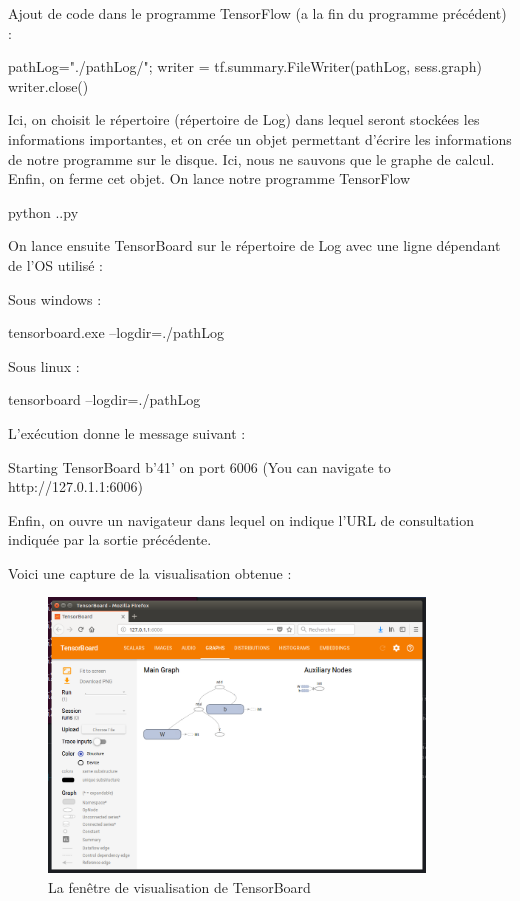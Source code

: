 \documentclass[a4paper,11pt]{book}
\theoremstyle{theo}
\begin{document}
Ajout de code dans le programme TensorFlow (a la fin du programme précédent) :
\begin{mypython}
pathLog="./pathLog/";
writer = tf.summary.FileWriter(pathLog, sess.graph)
writer.close()
\end{mypython}
Ici, on choisit le répertoire (répertoire de Log) dans lequel seront stockées les informations importantes, et on crée un objet permettant d'écrire les informations de notre programme sur le disque. Ici, nous ne sauvons que le graphe de calcul. Enfin, on ferme cet objet.
On lance notre programme TensorFlow 
\begin{mybash}
python .\premiersPas.py
\end{mybash}
On lance ensuite TensorBoard sur le répertoire de Log avec une ligne dépendant de l'OS utilisé :

Sous windows :
\begin{mybash}
tensorboard.exe --logdir=./pathLog
\end{mybash}
Sous linux :
\begin{mybash}
tensorboard --logdir=./pathLog
\end{mybash}

L’exécution donne le message suivant :
\begin{myoutput}
Starting TensorBoard b'41' on port 6006
(You can navigate to http://127.0.1.1:6006)
\end{myoutput}


Enfin, on ouvre un navigateur dans lequel on indique l'URL de consultation indiquée par la sortie précédente.

Voici une capture de la visualisation obtenue :
\begin{figure}[H]

\begin{center}
\includegraphics[width=10cm]{./figures/premierTensorFlow.png} 
\end{center}
\caption{La fenêtre de visualisation de TensorBoard}
\end{figure}
\end{document}
